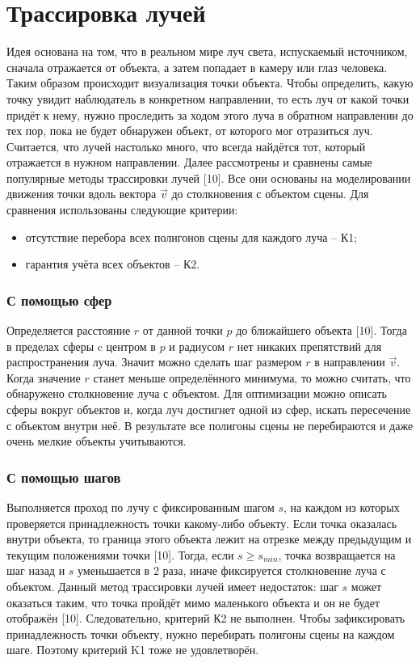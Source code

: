\section{Трассировка лучей} {
    Идея основана на том, что в реальном мире луч света, испускаемый источником,
    сначала отражается от объекта, а затем попадает в камеру или глаз человека.
    Таким образом происходит визуализация точки объекта.
    Чтобы определить, какую точку увидит наблюдатель в конкретном направлении, то есть луч от какой точки придёт к нему, нужно проследить за ходом этого луча
    в обратном направлении до тех пор, пока не будет обнаружен объект,
    от которого мог отразиться луч.
    Считается, что лучей настолько много, что всегда найдётся тот,
    который отражается в нужном направлении.
    Далее рассмотрены и сравнены самые популярные методы трассировки лучей [10].
    Все они основаны на моделировании движения точки вдоль вектора $\vec{v}$ до
    столкновения с объектом сцены.
    Для сравнения использованы следующие критерии:
    \begin{itemize}
        \item отсутствие перебора всех полигонов сцены для каждого луча -- К1;
        \item гарантия учёта всех объектов -- К2.
    \end{itemize}

    \subsubsection{С помощью сфер} {
        Определяется расстояние $r$ от данной точки $p$ до ближайшего объекта [10].
        Тогда в пределах сферы c центром в $p$ и радиусом $r$ нет никаких
        препятствий для распространения луча.
        Значит можно сделать шаг размером $r$ в направлении $\vec{v}$.
        Когда значение $r$ станет меньше определённого минимума, то можно считать,
        что обнаружено столкновение луча с объектом.
        Для оптимизации можно описать сферы вокруг объектов и, когда луч достигнет
        одной из сфер, искать пересечение с объектом внутри неё.
        В результате все полигоны сцены не перебираются и даже очень мелкие объекты
        учитываются.
    }

    \subsubsection{С помощью шагов} {
        Выполняется проход по лучу с фиксированным шагом $s$,
        на каждом из которых
        проверяется принадлежность точки какому-либо объекту.
        Если точка оказалась внутри объекта, то граница этого объекта лежит на
        отрезке между предыдущим и текущим положениями точки [10].
        Тогда, если $s \geq s_{min}$, точка возвращается на шаг назад и $s$
        уменьшается в 2 раза, иначе фиксируется столкновение луча с объектом.
        Данный метод трассировки лучей имеет недостаток:
        шаг $s$ может оказаться таким, что точка
        пройдёт мимо маленького объекта и он не будет отображён [10].
        Следовательно, критерий К2 не выполнен.
        Чтобы зафиксировать принадлежность точки объекту, нужно перебирать
        полигоны сцены на каждом шаге.
        Поэтому критерий K1 тоже не удовлетворён.
    }
    
}
